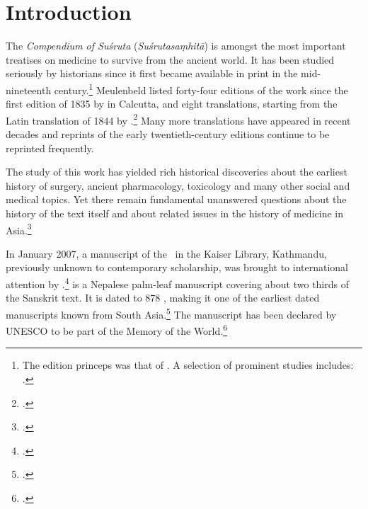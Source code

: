 \section{Introduction}


The \emph{Compendium of Suśruta} (\emph{Suśrutasaṃhitā}) is amongst the most
important treatises on medicine to survive from the ancient world. It has been
studied seriously by historians since it first became available in print in the
mid-nineteenth century.\footnote{The edition princeps was that of
    \citet{gupt-1835}.  A selection of prominent studies includes:
    \cites{hoer-1897,hoer-1906a,hoer-1906b,hoer-1907a,hoer-1907,stra-1934,
    sing-1972a,shar-1975, ray-1980, adri-1984,
    yano-1986,meul-hist,shar-1999,vali-2007}[and Meulenbeld's magnum 
    opus][]{meul-hist}.} %
    Meulenbeld listed forty-four editions of the work since the first edition of 1835
    by \citeauthor{gupt-1835} in Calcutta, and eight translations, starting from the
    Latin translation of 1844 by \citeauthor{hess-1855}.\footcite[IB,
    311\,ff.]{meul-hist}   Many more translations have appeared in recent decades and
    reprints of the early twentieth-century editions continue to be reprinted frequently.

The study of this work has yielded rich historical discoveries about 
the earliest history of surgery, ancient pharmacology, toxicology and many other 
social and medical topics. Yet there remain fundamental unanswered questions 
about the history of the text itself and about related issues in the history of 
medicine in Asia.\footcite[IA, 203–389]{meul-hist}

In January 2007, a manuscript of the \SS\ in the Kaiser Library, Kathmandu,
previously unknown to contemporary scholarship, was brought to international
attention by \citeauthor{dimi-kais}.\footcite{dimi-kais}  is a 
Nepalese palm-leaf
manuscript covering about two thirds of the Sanskrit text. It is dated to 878 \CE,
making it one of the earliest dated manuscripts known from South
Asia.\footcite[87–88]{hari-2011} The manuscript has been declared by UNESCO to be
part of the Memory of the World.\footcite{unes-2013}


